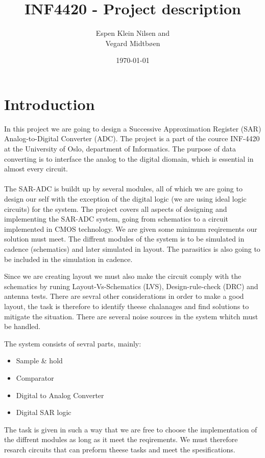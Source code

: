 \documentclass[english, 12pt, a4paper]{ifimaster}
\title{INF4420 - Project description}
\author{Espen Klein Nilsen and\\
	Vegard Midtbøen}
\date{\today}
\begin{document}
 \maketitle
 
\section*{Introduction}
In this project we are going to design a Successive Approximation Register (SAR) Analog-to-Digital Converter (ADC). The project is a part 
of the cource INF-4420 at the University of Oslo, department of Informatics. The purpose of data converting is to interface the analog to the 
digital diomain, which is essential in almost every circuit.\\
\\
The SAR-ADC is buildt up by several modules, all of which we are going to design our self with the exception of the digital logic (we are using ideal logic circuits) for the system. 
The project covers all aspects of designing and implementing the SAR-ADC system, going from schematics to a circuit implemented in CMOS technology. We are given some minimum reqirements our solution
must meet. The diffrent modules of the system is to be simulated in cadence (schematics) and later simulated in layout. The parasitics is also going to be included in the simulation in cadence.

Since we are creating layout we must also make the circuit comply with the schematics by runing Layout-Vs-Schematics (LVS), Design-rule-check (DRC) and antenna tests. 
There are sevral other considerations in order to make a good layout, 
the task is therefore to identify theese chalanages and find solutions to mitigate the situation. There are several noise sources in the system whitch must be handled.

The system consists of sevral parts, mainly:

\begin{itemize}
 \item Sample \& hold
 \item Comparator
 \item Digital to Analog Converter
 \item Digital SAR logic
\end{itemize}


The task is given in such a way that we are free to choose the implementation of the diffrent modules as long as it meet the reqirements. 
We must therefore resarch circuits that can preform theese tasks and meet the spesifications. 
\end{document}
